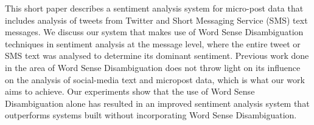 This short paper describes a sentiment analysis system for micro-post data that includes analysis of tweets from Twitter and Short Messaging Service (SMS) text messages. We discuss our system that makes use of Word Sense Disambiguation techniques in sentiment analysis at the message level, where the entire tweet or SMS text was analysed to determine its dominant sentiment. Previous work done in the area of Word Sense Disambiguation does not throw light on its influence on the analysis of social-media text and micropost data, which is what our work aims to achieve. Our experiments show that the use of Word Sense Disambiguation alone has resulted in an improved sentiment analysis system that outperforms systems built without incorporating Word Sense Disambiguation.
